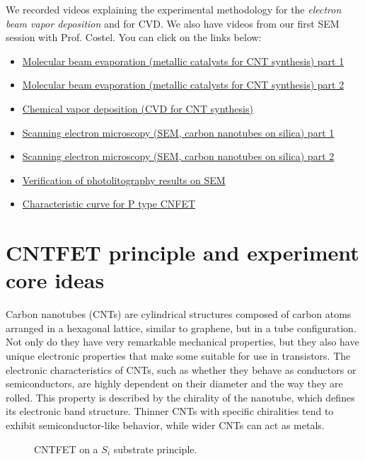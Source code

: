 \documentclass[a4paper,12pt,twoside]{article}
\begin{document}
We recorded videos explaining the experimental methodology for the \textit{electron beam vapor deposition} and for CVD. We also have videos from our first SEM session with Prof. Costel. You can click on the links below:
\begin{itemize}
    \item \href{https://www.youtube.com/yIN483XxH1w}{Molecular beam evaporation (metallic catalysts for CNT synthesis) part 1}
    \item \href{https://www.youtube.com/Pil0u2AQIpo}{Molecular beam evaporation (metallic catalysts for CNT synthesis) part 2}
    \item \href{https://youtu.be/rstTsvE_jYo}{Chemical vapor deposition (CVD for CNT synthesis)}
    \item \href{https://www.youtube.com/jHOiCVn45UQ}{Scanning electron microscopy (SEM, carbon nanotubes on silica) part 1}
    \item \href{https://youtu.be/uCtEx1HjjsI}{Scanning electron microscopy (SEM, carbon nanotubes on silica) part 2}
    \item \href{https://youtu.be/4y9EVG-1USM}{Verification of photolitography results on SEM}
    \item \href{https://youtu.be/3TylOsFjjZY}{Characteristic curve for P type CNFET}
\end{itemize}

\newpage
\setcounter{section}{-1}
\section{CNTFET principle and experiment core ideas}
Carbon nanotubes (CNTs) are cylindrical structures composed of carbon atoms arranged in a hexagonal lattice, similar to graphene, but in a tube configuration. Not only do they have very remarkable mechanical properties, but they also have unique electronic properties that make some suitable for use in transistors. The electronic characteristics of CNTs, such as whether they behave as conductors or semiconductors, are highly dependent on their diameter and the way they are rolled. This property is described by the chirality of the nanotube, which defines its electronic band structure. Thinner CNTs with specific chiralities tend to exhibit semiconductor-like behavior, while wider CNTs can act as metals.
\begin{figure}[h]
    \centering
    \caption{CNTFET on a $S_i$ substrate principle.}
\end{figure}
\end{document}
